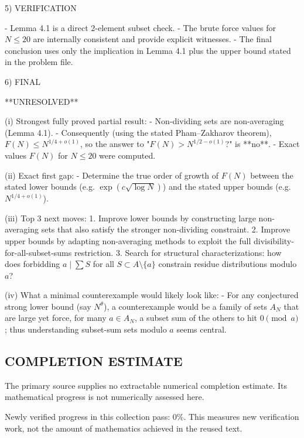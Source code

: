5) VERIFICATION

- Lemma 4.1 is a direct 2-element subset check.
- The brute force values for $N\le 20$ are internally consistent and provide explicit witnesses.
- The final conclusion uses only the implication in Lemma 4.1 plus the upper bound stated in the problem file.

6) FINAL

**UNRESOLVED**

(i) Strongest fully proved partial result:
- Non-dividing sets are non-averaging (Lemma 4.1).
- Consequently (using the stated Pham--Zakharov theorem), $F(N)\le N^{1/4+o(1)}$, so the answer to "$F(N)>N^{1/2-o(1)}$?" is **no**.
- Exact values $F(N)$ for $N\le 20$ were computed.

(ii) Exact first gap:
- Determine the true order of growth of $F(N)$ between the stated lower bounds (e.g. $\exp(c\sqrt{\log N})$) and the stated upper bounds (e.g. $N^{1/4+o(1)}$).

(iii) Top 3 next moves:
1. Improve lower bounds by constructing large non-averaging sets that also satisfy the stronger non-dividing constraint.
2. Improve upper bounds by adapting non-averaging methods to exploit the full divisibility-for-all-subset-sums restriction.
3. Search for structural characterizations: how does forbidding $a\mid\sum S$ for all $S\subset A\setminus\{a\}$ constrain residue distributions modulo $a$?

(iv) What a minimal counterexample would likely look like:
- For any conjectured strong lower bound (say $N^{\theta}$), a counterexample would be a family of sets $A_N$ that are large yet force, for many $a\in A_N$, a subset sum of the others to hit $0\pmod a$; thus understanding subset-sum sets modulo $a$ seems central.




\subsection*{COMPLETION ESTIMATE}
The primary source supplies no extractable numerical completion estimate. Its mathematical progress is not numerically assessed here.

Newly verified progress in this collection pass: $0\%$. This measures new verification work, not the amount of mathematics achieved in the reused text.
